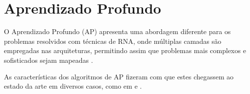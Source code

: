 





\section{Aprendizado Profundo}

\par O Aprendizado Profundo (AP) apresenta uma abordagem diferente para os problemas resolvidos com técnicas de RNA, onde múltiplas camadas são empregadas nas arquiteturas, permitindo assim que problemas mais complexos e sofisticados sejam mapeadas \cite{Goodfellow-et-al-2016}.

\par As características dos algoritmos de AP fizeram com que estes chegassem ao estado da arte em diversos casos, como em \cite{Shankar2017} e \cite{Krizhevsky2012}. 


